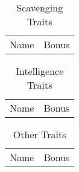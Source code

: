 \begin{table}[h]
		\begin{tabularx}{\linewidth}{|l|X|}
		\hline
		Name & Bonus\\
		\end{tabularx}
	\caption{Scavenging Traits}
	\label{tab:ScavengingTraits}
\end{table}

\begin{table}[h]
		\begin{tabularx}{\linewidth}{|l|X|}
		\hline
		Name & Bonus\\
		\end{tabularx}
	\caption{Intelligence Traits}
	\label{tab:IntelligenceTraits}
\end{table}

\begin{table}[h]
		\begin{tabularx}{\linewidth}{|l|X|}
		\hline
		Name & Bonus\\
		\end{tabularx}
	\caption{Other Traits}
	\label{tab:OtherTraits}
\end{table}